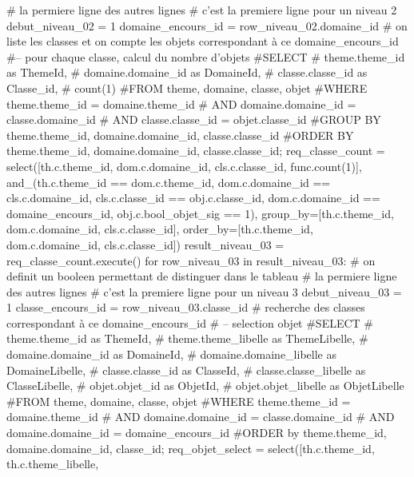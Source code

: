 \documentclass[12pt,titlepage,oneside]{book}
\begin{document}
\begin{lbdpython}
      # la permiere ligne des autres lignes
      # c'est la premiere ligne pour un niveau 2
      debut_niveau_02 = 1
      domaine_encours_id = row_niveau_02.domaine_id
      # on liste les classes et on compte les objets correspondant à ce domaine_encours_id
      #-- pour chaque classe, calcul du nombre d'objets
      #SELECT
      #   theme.theme_id as ThemeId,
      #   domaine.domaine_id as DomaineId,
      #   classe.classe_id as Classe_id,
      #   count(1)
      #FROM theme, domaine, classe, objet
      #WHERE theme.theme_id = domaine.theme_id 
      #  AND domaine.domaine_id = classe.domaine_id
      #  AND classe.classe_id = objet.classe_id
      #GROUP BY theme.theme_id, domaine.domaine_id, classe.classe_id
      #ORDER BY theme.theme_id, domaine.domaine_id, classe.classe_id;
      req_classe_count = select([th.c.theme_id, dom.c.domaine_id,
                                 cls.c.classe_id, func.count(1)],
                         and_(th.c.theme_id == dom.c.theme_id,
                              dom.c.domaine_id == cls.c.domaine_id,
                              cls.c.classe_id == obj.c.classe_id,
                              dom.c.domaine_id == domaine_encours_id,
                              obj.c.bool_objet_sig == 1),
                         group_by=[th.c.theme_id, dom.c.domaine_id, cls.c.classe_id],
                         order_by=[th.c.theme_id, dom.c.domaine_id, cls.c.classe_id])
      result_niveau_03 = req_classe_count.execute()
      for row_niveau_03 in result_niveau_03:
         # on definit un booleen permettant de distinguer dans le tableau
         # la permiere ligne des autres lignes
         # c'est la premiere ligne pour un niveau 3
         debut_niveau_03 = 1
         classe_encours_id = row_niveau_03.classe_id
         # recherche des classes correspondant à ce domaine_encours_id
         # -- selection objet
         #SELECT
         #   theme.theme_id as ThemeId,
         #   theme.theme_libelle as ThemeLibelle,
         #   domaine.domaine_id as DomaineId,
         #   domaine.domaine_libelle as DomaineLibelle,
         #   classe.classe_id as ClasseId,
         #   classe.classe_libelle as ClasseLibelle,
         #   objet.objet_id as ObjetId,
         #   objet.objet_libelle as ObjetLibelle
         #FROM theme, domaine, classe, objet
         #WHERE theme.theme_id = domaine.theme_id
         #  AND domaine.domaine_id = classe.domaine_id
         #  AND domaine.domaine_id = domaine_encours_id
         #ORDER by theme.theme_id, domaine.domaine_id, classe_id;
         req_objet_select = select([th.c.theme_id, th.c.theme_libelle,

\end{lbdpython}
\end{document}
